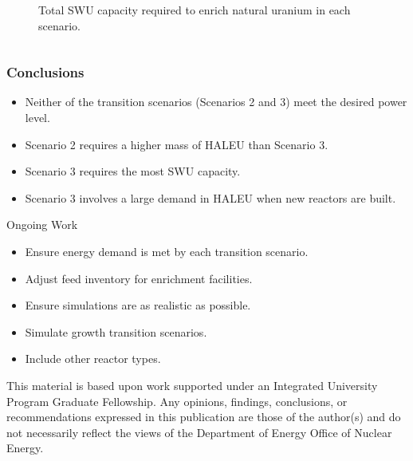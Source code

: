 \begin{frame}
\begin{columns}
\begin{figure}[h]
            \vspace*{-0.5cm}
      \caption{Total \gls{SWU} capacity required to enrich natural uranium in each scenario.}
      \label{fig:swu}
  \end{figure}
  \end{columns}
\end{frame}


\begin{frame}
\frametitle{Conclusions}
    \begin{itemize}
        \item Neither of the transition scenarios (Scenarios 2 and 3) meet the desired power level.
        \item Scenario 2 requires a higher mass of \gls{HALEU} than Scenario 3.
        \item Scenario 3 requires the most \gls{SWU} capacity.
        \item Scenario 3 involves a large demand in \gls{HALEU} when 
              new reactors are built.
    \end{itemize}

    \begin{block}{Ongoing Work}
        \begin{itemize}
            \item Ensure energy demand is met by each transition scenario.
            \item Adjust feed inventory for enrichment facilities.
            \item Ensure simulations are as realistic as possible.
            \item Simulate growth transition scenarios.
            \item Include other reactor types.
        \end{itemize}
    \end{block}
    \vspace{1.7cm}
    \scriptsize
    This material is based upon work supported under an Integrated University 
Program Graduate Fellowship. Any opinions, findings, conclusions, or 
recommendations expressed in this publication are those of the author(s) 
and do not necessarily reflect the views of the Department of Energy Office 
of Nuclear Energy.

\end{frame}
